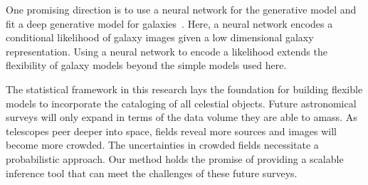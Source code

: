 One promising direction is to use a neural network for the generative model and fit a deep generative model for galaxies~\cite{Arcelin_2020, lanusse2020deep, Reiman_2019_gans_deblend, Regier2015ADG}. 
Here, a neural network encodes a conditional likelihood of galaxy images given a low dimensional galaxy representation. 
Using a neural network to encode a likelihood extends the flexibility of galaxy models beyond the simple models used here. 




The statistical framework in this research lays the foundation for building flexible models to incorporate the cataloging of all celestial objects. 
Future astronomical surveys will only expand in terms of the data volume they are able to amass. 
As telescopes peer deeper into space, fields reveal more sources and images will become more crowded. 
The uncertainties in crowded fields necessitate a probabilistic approach. 
Our method holds the promise of providing  a scalable inference tool that can meet the challenges of these future surveys. 





